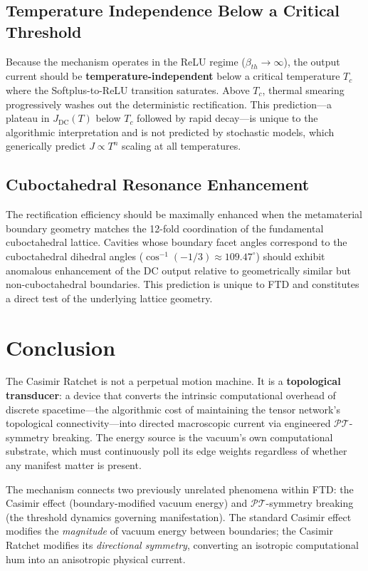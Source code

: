 \documentclass[11pt, letterpaper]{article}
\newcommand{\PT}{\mathcal{PT}}
\theoremstyle{definition}
\theoremstyle{remark}
\begin{document}
\subsection{Temperature Independence Below a Critical Threshold}
Because the mechanism operates in the ReLU regime ($\beta_{th} \to \infty$), the output current should be \textbf{temperature-independent} below a critical temperature $T_c$ where the Softplus-to-ReLU transition saturates. Above $T_c$, thermal smearing progressively washes out the deterministic rectification. This prediction---a plateau in $J_{\text{DC}}(T)$ below $T_c$ followed by rapid decay---is unique to the algorithmic interpretation and is not predicted by stochastic models, which generically predict $J \propto T^n$ scaling at all temperatures.

\subsection{Cuboctahedral Resonance Enhancement}
The rectification efficiency should be maximally enhanced when the metamaterial boundary geometry matches the 12-fold coordination of the fundamental cuboctahedral lattice. Cavities whose boundary facet angles correspond to the cuboctahedral dihedral angles ($\cos^{-1}(-1/3) \approx 109.47^\circ$) should exhibit anomalous enhancement of the DC output relative to geometrically similar but non-cuboctahedral boundaries. This prediction is unique to FTD and constitutes a direct test of the underlying lattice geometry.

\section{Conclusion}

The Casimir Ratchet is not a perpetual motion machine. It is a \textbf{topological transducer}: a device that converts the intrinsic computational overhead of discrete spacetime---the algorithmic cost of maintaining the tensor network's topological connectivity---into directed macroscopic current via engineered $\PT$-symmetry breaking. The energy source is the vacuum's own computational substrate, which must continuously poll its edge weights regardless of whether any manifest matter is present.

The mechanism connects two previously unrelated phenomena within FTD: the Casimir effect (boundary-modified vacuum energy) and $\PT$-symmetry breaking (the threshold dynamics governing manifestation). The standard Casimir effect modifies the \textit{magnitude} of vacuum energy between boundaries; the Casimir Ratchet modifies its \textit{directional symmetry}, converting an isotropic computational hum into an anisotropic physical current.
\end{document}
